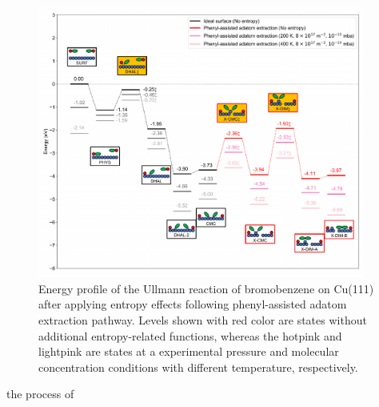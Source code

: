 \documentclass[aps,prl,reprint,amsmath,amssymb,floatfix,notitlepage]{revtex4-1}
\newcommand{\zhzh}{\color{blue}}
\newcommand{\zhzh}{\color{blue}}
\begin{document}
\begin{figure}[bt]
\centering
\includegraphics[width=0.96\textwidth]{Fig/Entropy_adatom.pdf}
\caption{{\zhzh Energy profile of the Ullmann reaction of bromobenzene on Cu(111) after applying entropy effects following phenyl-assisted adatom extraction pathway. Levels shown with red color are states without additional entropy-related functions, whereas the hotpink and lightpink are states at a experimental pressure and molecular concentration conditions with different temperature, respectively.}} 
\label{fig:entropy_adatom}
\end{figure}
 the process of

\end{document}
